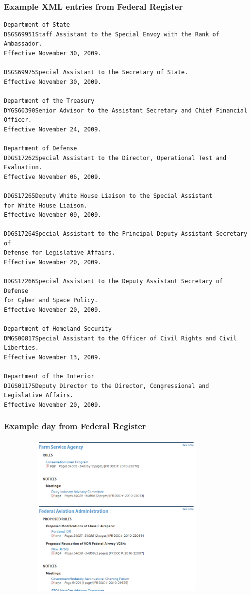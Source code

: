 \documentclass{beamer}
\begin{document}
\begin{frame}[fragile]
\frametitle{Example XML entries from Federal Register}
\scriptsize
\begin{verbatim}
Department of State
DSGS69951Staff Assistant to the Special Envoy with the Rank of Ambassador. 
Effective November 30, 2009.

DSGS69975Special Assistant to the Secretary of State. 
Effective November 30, 2009.

Department of the Treasury
DYGS60390Senior Advisor to the Assistant Secretary and Chief Financial Officer. 
Effective November 24, 2009.

Department of Defense
DDGS17262Special Assistant to the Director, Operational Test and Evaluation. 
Effective November 06, 2009.

DDGS17265Deputy White House Liaison to the Special Assistant 
for White House Liaison. 
Effective November 09, 2009.

DDGS17264Special Assistant to the Principal Deputy Assistant Secretary of 
Defense for Legislative Affairs. 
Effective November 20, 2009.

DDGS17266Special Assistant to the Deputy Assistant Secretary of Defense 
for Cyber and Space Policy. 
Effective November 20, 2009.

Department of Homeland Security
DMGS00817Special Assistant to the Officer of Civil Rights and Civil Liberties. 
Effective November 13, 2009.

Department of the Interior
DIGS01175Deputy Director to the Director, Congressional and Legislative Affairs. 
Effective November 20, 2009.
\end{verbatim}
\end{frame}

\begin{frame}[fragile]
\frametitle{Example day from Federal Register}
\begin{figure}
\includegraphics[height=3.25in,width=4in]{3Feb2010.pdf}
\end{figure}
\end{frame}
\end{document}
